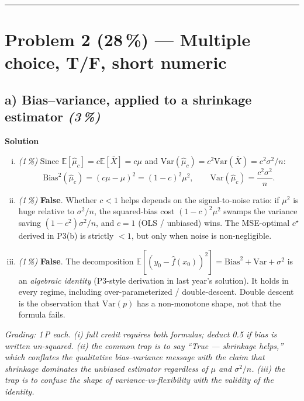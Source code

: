 \documentclass[11pt,a4paper]{article}
\newcommand{\points}[1]{\textbf{(#1\,\%)}}
\newcommand{\subpoints}[1]{\textit{(#1\,\%)}}
\newcommand{\sol}{\noindent\textbf{Solution}}
\begin{document}
\vspace{0.6em}
\hrule
\vspace{1em}

\section*{Problem 2 \points{28} --- Multiple choice, T/F, short numeric}

\subsection*{a) Bias--variance, applied to a shrinkage estimator \subpoints{3}}
\sol{}
\begin{enumerate}[(i)]
  \item \subpoints{1} Since $\mathbb E[\hat\mu_c] = c\mathbb E[\bar X] = c\mu$ and
        $\mathrm{Var}(\hat\mu_c) = c^2\mathrm{Var}(\bar X) = c^2\sigma^2/n$:
        $$\boxed{\;\mathrm{Bias}^2(\hat\mu_c) = (c\mu - \mu)^2 = (1-c)^2\mu^2,
        \qquad \mathrm{Var}(\hat\mu_c) = \frac{c^2\sigma^2}{n}.\;}$$
  \item \subpoints{1} \textbf{False}. Whether $c < 1$ helps depends on the signal-to-noise ratio:
        if $\mu^2$ is huge relative to $\sigma^2/n$, the squared-bias cost $(1-c)^2\mu^2$ swamps the
        variance saving $(1 - c^2)\sigma^2/n$, and $c=1$ (OLS / unbiased) wins. The MSE-optimal
        $c^\star$ derived in P3(b) is strictly $<1$, but only when noise is non-negligible.
  \item \subpoints{1} \textbf{False}. The decomposition
        $\mathbb E[(y_0 - \hat f(x_0))^2] = \mathrm{Bias}^2 + \mathrm{Var} + \sigma^2$ is an
        \emph{algebraic identity} (P3-style derivation in last year's solution). It holds in every
        regime, including over-parameterized / double-descent. Double descent is the observation
        that $\mathrm{Var}(p)$ has a non-monotone shape, not that the formula fails.
\end{enumerate}

\noindent\emph{Grading: 1\,P each. (i) full credit requires both formulas; deduct 0.5 if bias is
written un-squared. (ii) the common trap is to say ``True --- shrinkage helps,'' which conflates
the qualitative bias--variance message with the claim that shrinkage dominates the unbiased estimator
regardless of $\mu$ and $\sigma^2/n$. (iii) the trap is to confuse the \emph{shape} of
variance-vs-flexibility with the validity of the identity.}
\end{document}
